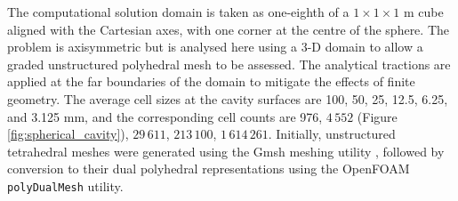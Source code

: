 \documentclass[sn-mathphys,Numbered]{sn-jnl}%
\begin{document}
The computational solution domain is taken as one-eighth of a $1 \times 1 \times 1$ m cube aligned with the Cartesian axes, with one corner at the centre of the sphere.
The problem is axisymmetric but is analysed here using a 3-D domain to allow a graded unstructured polyhedral mesh to be assessed.
The analytical tractions are applied at the far boundaries of the domain to mitigate the effects of finite geometry.
The average cell sizes at the cavity surfaces are 100, 50, 25, 12.5, 6.25, and 3.125 mm, and the corresponding cell counts are 976, $4\,552$ (Figure \ref{fig:spherical_cavity}), $29\,611$, $213\,100$, $1\,614\,261$.
Initially, unstructured tetrahedral meshes were generated using the Gmsh meshing utility \cite{geuzaine2009gmsh}, followed by conversion to their dual polyhedral representations using the OpenFOAM \texttt{polyDualMesh} utility.
\end{document}
